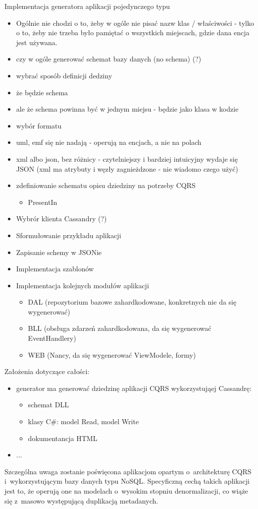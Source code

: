 Implementacja generatora aplikacji pojedynczego typu
 \begin{itemize}
  \item Ogólnie nie chodzi o to, żeby w ogóle nie pisać nazw klas / właściwości - tylko o to, żeby nie trzeba było pamiętać o wszystkich miejscach, gdzie dana encja jest używana.
  \item czy w ogóle generować schemat bazy danych (no schema) (?)
  \item wybrać sposób definicji dedziny
   \item że będzie schema
   \item ale że schema powinna być w jednym miejsu - będzie jako klasa w kodzie
   \item wybór formatu
    \item uml, emf się nie nadają - operują na encjach, a nie na polach
    \item xml albo json, bez różnicy - czytelniejszy i bardziej intuicyjny wydaje się JSON (xml ma atrybuty i węzły zagnieżdzone - nie wiadomo czego użyć)
   \item zdefiniowanie schematu opisu dziedziny na potrzeby CQRS
    \begin{itemize}
     \item PresentIn
    \end{itemize}
  \item Wybrór klienta Cassandry (?)
  \item Sformułowanie przykładu aplikacji
  \item Zapisanie schemy w JSONie
  \item Implementacja szablonów
  \item Implementacja kolejnych modułów aplikacji
   \begin{itemize}
    \item DAL (repozytorium bazowe zahardkodowane, konkretnych nie da się wygenerować)
    \item BLL (obsługa zdarzeń zahardkodowana, da się wygenerować EventHandlery)
    \item WEB (Nancy, da się wygenerować ViewModele, formy)
   \end{itemize}
 \end{itemize}



Założenia dotyczące całości:

\begin{itemize}
 \item generator ma generować dziedzinę aplikacji CQRS wykorzystująej Cassandrę:
  \begin{itemize}
   \item schemat DLL
   \item klasy C\#: model Read, model Write
   \item dokumentancja HTML
  \end{itemize}
 \item ...
\end{itemize}

Szczególna uwaga zostanie poświęcona aplikacjom opartym o~architekturę CQRS i~wykorzystującym bazy danych typu NoSQL.
Specyficzną cechą takich aplikacji jest to, że operują one na modelach o~wysokim stopniu denormalizacji, co wiąże się z~masowo występującą duplikacją metadanych.
